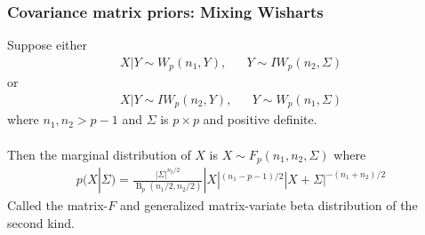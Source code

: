 \documentclass[xcolor=dvipsnames]{beamer}
\DeclareMathOperator{\tr}{tr}
\DeclareMathOperator{\B}{B}
\begin{document}



\begin{frame}
  \frametitle{Covariance matrix priors: Mixing Wisharts}
Suppose either 
\begin{align*}
X|Y \sim W_p(n_1,Y), &&Y\sim IW_p(n_2,\Sigma)
\end{align*}
or
\begin{align*}
X|Y \sim IW_p(n_2,Y), &&Y\sim W_p(n_1,\Sigma)
\end{align*}
where $n_1,n_2>p-1$ and $\Sigma$ is $p\times p$ and positive definite.\\~\\
\pause 
Then the marginal distribution of $X$ is $X\sim F_p(n_1,n_2,\Sigma)$ where
\begin{align*}
 p(X|\Sigma) = \frac{\left|\Sigma\right|^{n_2/2}}{\B_p(n_1/2,n_2/2)}|X|^{(n_1 - p - 1)/2}|X + \Sigma|^{-(n_1 + n_2)/2}
\end{align*}
Called the matrix-$F$ and generalized matrix-variate beta distribution of the second kind.
\end{frame}

\end{document}
